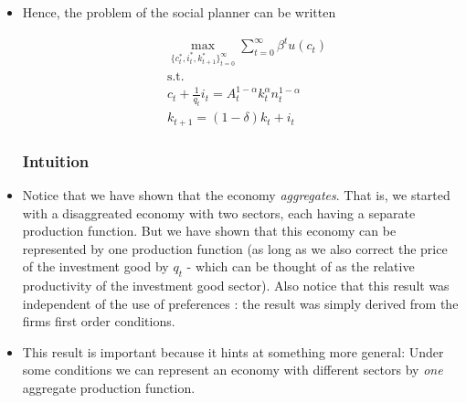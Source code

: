 \documentclass{scrartcl}
\begin{document}
\begin{itemize}
\item Hence, the problem of the social planner can be written 
		
		\begin{align}
		&\max_{\{{c_t^*,i_t^*, k_{t+1}^* }\}_{t=0}^{\infty}} {\sum_{t=0}^{\infty} \beta^t u(c_t)} \\
		&\text{s.t. } \nonumber \\
		&c_t+\frac{1}{q_t} i_t=A_t^{1-\alpha} k_t^{\alpha} n_t^{1-\alpha} \nonumber \\
		&k_{t+1}=(1-\delta)k_t+i_t \nonumber
		\end{align}
	
	\subsubsection*{Intuition}
	
\item Notice that we have shown that the economy \emph{aggregates}. That is, we started with a disaggreated economy with two sectors,  each having a separate production function. But we have shown that this economy can be represented by one production function (as long as we also correct the price of the investment good by $q_t$ - which can be thought of as the relative productivity of the investment good sector). Also notice that this result was independent of the use of preferences : the result was simply derived from the firms first order conditions.

\item This result is important because it hints at something more general: Under some conditions we can represent an economy with different sectors by \emph{one} aggregate production function.
	
\end{itemize}
\end{document}
